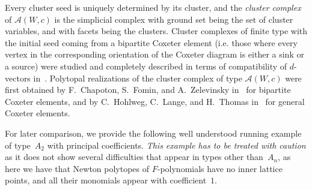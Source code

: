 \documentclass[ALCO,Unicode,ThmDefs]{cedram}
\newcommand{\Dfn}[1]{\emph{#1}}
\newcommand{\Alg}{\mathcal{A}}
\begin{document}
Every cluster seed is uniquely determined by its cluster, and the \Dfn{cluster complex} of $\Alg(W,c)$ is the simplicial complex with ground set being the set of cluster variables, and with facets being the clusters. Cluster complexes of finite type with the initial seed coming from a bipartite Coxeter element (i.e. those where every vertex in the corresponding orientation of the Coxeter diagram is either a sink or a source) were studied and completely described in terms of compatibility of $d$-vectors in~\cite{FZ2003}. Polytopal realizations of the cluster complex of type $\Alg(W,c)$ were first obtained by F.~Chapoton, S.~Fomin, and A.~Zelevinsky in~\cite{CFZ2002} for bipartite Coxeter elements, and by C.~Hohlweg, C.~Lange, and H.~Thomas in~\cite{HLT2011} for general Coxeter elements.

\medskip

For later comparison, we provide the following well understood running example of type~$A_2$ with principal coefficients. \emph{This example has to be treated with caution} as it does not show several difficulties that appear in types other than~$A_n$, as here we have that Newton polytopes of $F$-polynomials have no inner lattice points, and all their monomials appear with coefficient~$1$.

\end{document}
